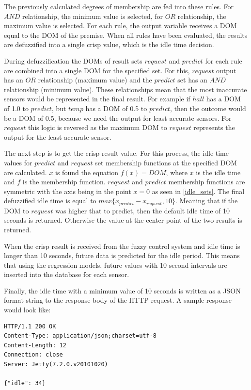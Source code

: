 The previously calculated degrees of membership are fed into these rules. For $AND$ relationship, the minimum value is selected, for $OR$ relationship, the maximum value is selected. For each rule, the output variable receives a DOM equal to the DOM of the premise. When all rules have been evaluated, the results are defuzzified into a single crisp value, which is the idle time decision. 

During defuzzification the DOMs of result sets $request$ and $predict$ for each rule are combined into a single DOM for the specified set. For this, $request$ output has an $OR$ relationship (maximum value) and the $predict$ set has an $AND$ relationship (minimum value). These relationships mean that the most inaccurate sensors would be represented in the final result. For example if $hall$ has a DOM of 1.0 to $predict$, but $temp$ has a DOM of 0.5 to $predict$, then the outcome would be a DOM of 0.5, because we need the output for least accurate sensors. For $request$ this logic is reversed as the maximum DOM to $request$ represents the output for the least accurate sensor. 

The next step is to get the crisp result value. For this process, the idle time values for $predict$ and $request$ set membership functions at the specified DOM are calculated. $x$ is found the equation $f(x) = DOM$, where $x$ is the idle time and $f$ is the membership function. $request$ and $predict$ membership functions are symmetric with the axis being in the point $x = 0$ as seen in \autoref{idle_sets}. The final defuzzified idle time is equal to $max\{x_{predict} - x_{request}, 10\}$. Meaning that if the DOM to $request$ was higher that to predict, then the default idle time of 10 seconds is returned. Otherwise the value at the center point of the two results is returned.

When the crisp result is received from the fuzzy control system and idle time is longer than 10 seconds, future data is predicted for the idle period. This means that using the regression models, future values with 10 second intervals are inserted into the database for each sensor. 

Finally, the idle time with a minimum value of 10 seconds is written as a JSON format string to the response body of the HTTP request. A sample response would look like:

\begin{lstlisting}
HTTP/1.1 200 OK
Content-Type: application/json;charset=utf-8
Content-Length: 12
Connection: close
Server: Jetty(7.2.0.v20101020)

{"idle": 34}
\end{lstlisting}

